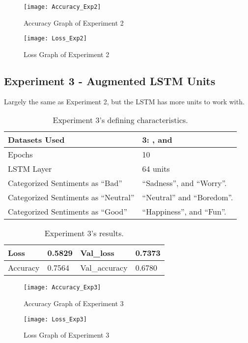 \begin{figure}[!h]
	\centering
	\texttt{[image: Accuracy\_Exp2]}
	\caption{Accuracy Graph of Experiment 2}
	\label{fig:accuracy_exp2}
	\texttt{[image: Loss\_Exp2]}
	\caption{Loss Graph of Experiment 2}
	\label{fig:loss_exp2}
\end{figure}
\pagebreak

\subsection{Experiment 3 - Augmented LSTM Units}
\label{exp3}
Largely the same as Experiment 2, but the LSTM has more units to work with.
\begin{table}[!th]
	\caption{Experiment 3's defining characteristics.}
	\vspace{0.5cm}
	\centering
	\begin{tabular}[t]{|l|l|}
	\hline
		Datasets Used & \makecell{3: \citet{d1}, \citet{d2} and\\ \citet{d3}}
	\\ \hline
		Epochs & 10
	\\ \hline
		LSTM Layer & 64 units
	\\ \hline
		Categorized Sentiments as ``Bad'' & ``Sadness'', and ``Worry''.
	\\ \hline	
		 Categorized Sentiments as ``Neutral'' & ``Neutral'' and ``Boredom''.
	\\ \hline	
		Categorized Sentiments as ``Good'' & ``Happiness'', and ``Fun''.
	\\ \hline
	\end{tabular}
\end{table}

\begin{table}[!bh]
	\caption{Experiment 3's results.}
	\vspace{0.5cm}
	\centering
	\begin{tabular}[t]{|l|l|l|l|}
	\hline
		Loss & 0.5829 & Val\_loss & 0.7373
	\\ \hline
		Accuracy & 0.7564 & Val\_accuracy & 0.6780
	\\ \hline
	\end{tabular}
\end{table}


\begin{figure}[!h]
	\centering
	\texttt{[image: Accuracy\_Exp3]}
	\caption{Accuracy Graph of Experiment 3}
	\label{fig:accuracy_exp3}
	\texttt{[image: Loss\_Exp3]}
	\caption{Loss Graph of Experiment 3}
	\label{fig:loss_exp3}
\end{figure}
\pagebreak

